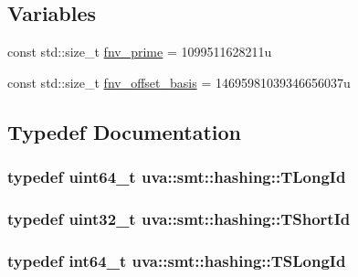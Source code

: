 \subsection*{Variables}
\begin{DoxyCompactItemize}
\item 
const std\+::size\+\_\+t \hyperlink{namespaceuva_1_1smt_1_1hashing_a1d75c23c055906113f9c29f0ef93c3be}{fnv\+\_\+prime} = 1099511628211u
\item 
const std\+::size\+\_\+t \hyperlink{namespaceuva_1_1smt_1_1hashing_a114900b041415523076700317d62613a}{fnv\+\_\+offset\+\_\+basis} = 14695981039346656037u
\end{DoxyCompactItemize}


\subsection{Typedef Documentation}
\hypertarget{namespaceuva_1_1smt_1_1hashing_a5992ac0dea0fb3226fb403ede09fad55}{}
\subsubsection[{T\+Long\+Id}]{\setlength{\rightskip}{0pt plus 5cm}typedef uint64\+\_\+t {\bf uva\+::smt\+::hashing\+::\+T\+Long\+Id}}\label{namespaceuva_1_1smt_1_1hashing_a5992ac0dea0fb3226fb403ede09fad55}
\hypertarget{namespaceuva_1_1smt_1_1hashing_adcf22e1982ad09d3a63494c006267469}{}
\subsubsection[{T\+Short\+Id}]{\setlength{\rightskip}{0pt plus 5cm}typedef uint32\+\_\+t {\bf uva\+::smt\+::hashing\+::\+T\+Short\+Id}}\label{namespaceuva_1_1smt_1_1hashing_adcf22e1982ad09d3a63494c006267469}
\hypertarget{namespaceuva_1_1smt_1_1hashing_a21827cb807d3f4d2fff506f1e5db5a3c}{}
\subsubsection[{T\+S\+Long\+Id}]{\setlength{\rightskip}{0pt plus 5cm}typedef int64\+\_\+t {\bf uva\+::smt\+::hashing\+::\+T\+S\+Long\+Id}}\label{namespaceuva_1_1smt_1_1hashing_a21827cb807d3f4d2fff506f1e5db5a3c}


